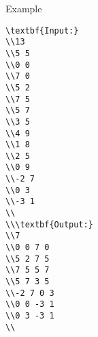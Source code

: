 Example
\begin{verbatim}
\textbf{Input:}
\\13
\\5 5
\\0 0
\\7 0
\\5 2
\\7 5
\\5 7
\\3 5
\\4 9
\\1 8
\\2 5
\\0 9
\\-2 7
\\0 3
\\-3 1
\\
\\\textbf{Output:}
\\7
\\0 0 7 0
\\5 2 7 5
\\7 5 5 7
\\5 7 3 5
\\-2 7 0 3
\\0 0 -3 1
\\0 3 -3 1
\\\end{verbatim}